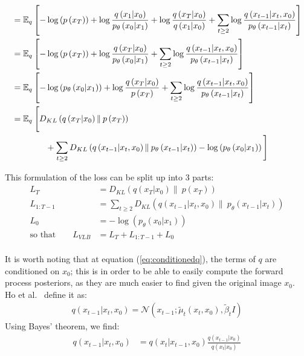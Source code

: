 \documentclass{article}
\numberwithin{equation}{section}
\numberwithin{figure}{section}
\begin{document}
{\begin{align}
  &= \mathbb{E}_q \left[-\log\left(p \left(x_T\right)\right) + \log \frac{q\left(x_1 | x_0\right)}{p_{\theta}\left(x_0 | x_1\right)} + \log \frac{q\left(x_T | x_0\right)}{q\left(x_1 | x_0\right)} + \sum_{t \geq 2} \log \frac{q\left(x_{t-1} | x_t, x_0\right)}{p_{\theta}\left(x_{t-1} | x_t\right)}\right] \\
  &= \mathbb{E}_q \left[-\log\left(p \left(x_T\right)\right) + \log \frac{q\left(x_T | x_0\right)}{p_{\theta}\left(x_0 | x_1\right)} + \sum_{t \geq 2} \log \frac{q\left(x_{t-1} | x_t, x_0\right)}{p_{\theta}\left(x_{t-1} | x_t\right)}\right] \\
  &= \mathbb{E}_q \left[- \log\left(p_{\theta}\left(x_0 | x_1\right)\right) + \log \frac{q\left(x_T | x_0\right)}{p \left(x_T\right)} + \sum_{t \geq 2} \log \frac{q\left(x_{t-1} | x_t, x_0\right)}{p_{\theta}\left(x_{t-1} | x_t\right)}\right] \\
  &= \mathbb{E}_q \: \Bigg[ D_{KL}\left(q\left(x_T | x_0\right) \| \: p\left(x_T\right)\right) \Bigg.  \\
  &\qquad \qquad \Bigg. + \sum_{t \geq 2} D_{KL}\left(q\left(x_{t-1} | x_t, x_0\right) \| \: p_{\theta}\left(x_{t-1} | x_t\right)\right) - \log\left(p_{\theta}\left(x_0 | x_1\right)\right) \Bigg] \notag
\end{align}
}

This formulation of the loss can be split up into 3 parts:
\begin{align}
  L_T &= D_{KL}\left(q\left(x_T | x_0\right) \| \: p\left(x_T\right)\right) \label{eq:lT}\\
  L_{1:T-1} &= \sum_{t \geq 2} D_{KL}\left(q\left(x_{t-1} | x_t, x_0\right) \| \: p_{\theta}\left(x_{t-1} | x_t\right)\right) \\
  L_0 &=  - \log\left(p_{\theta}\left(x_0 | x_1\right)\right) \\
  \text{so that} \qquad L_{VLB} &= L_T + L_{1:T-1} + L_0
\end{align}
\\
It is worth noting that at equation (\ref{eq:conditionedq}), the terms of $q$ are conditioned on $x_0$; this is in order to be able to easily compute the forward process posteriors, as they are much easier to find given the original image $x_0$. \\
Ho et al.~\cite{ho2020denoising} define it as:
\begin{gather}
  q\left(x_{t-1} | x_t, x_0\right) = \mathcal{N}\left(x_{t-1}; \tilde{\mu}_t \left(x_t, x_0\right), \tilde{\beta}_t I\right)
\end{gather}
Using Bayes' theorem, we find:
\begin{align}
  q\left(x_{t-1} | x_t, x_0\right) &= q\left(x_t | x_{t-1}, x_0\right) \frac{q\left(x_{t-1}| x_0\right)}{q\left(x_t | x_0\right)} \label{eq:ddpmbayes}
\end{align}
\end{document}
